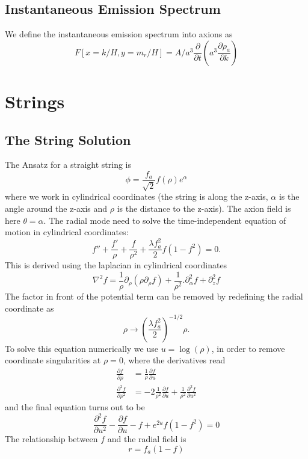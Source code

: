 \documentclass[a4paper]{article}
\begin{document}
\subsection{Instantaneous Emission Spectrum}
We define the instantaneous emission spectrum into axions as
\begin{equation}
    F[x = k / H, y = m_r / H] = A / a^3 \frac{\partial}{\partial t} \left( a^3 \frac{\partial \rho_a}{\partial k} \right)
\end{equation}

\newpage
\section{Strings}


\subsection{The String Solution}

The Ansatz for a straight string is
\begin{equation}
	\phi = \frac{f_a}{\sqrt{2}} f(\rho) e^{\alpha}
\end{equation}
where we work in cylindrical coordinates (the string is along the z-axis, $\alpha$ is the angle around the z-axis and $\rho$ is the distance to the z-axis).
The axion field is here $\theta = \alpha$.
The radial mode need to solve the time-independent equation of motion in cylindrical coordinates:
\begin{equation}
	f'' + \frac{f'}{\rho} + \frac{f}{\rho^2} + \frac{\lambda f_a^2}{2} f (1 - f^2) = 0.
\end{equation}
This is derived using the laplacian in cylindrical coordinates 
\begin{equation}
	\nabla^2 f = \frac{1}{\rho} \partial_\rho (\rho \partial_\rho f) + \frac{1}{\rho^2}. \partial_\alpha^2 f + \partial_z^2 f
\end{equation}
The factor in front of the potential term can be removed by redefining the radial coordinate 
as
\begin{equation}
	\rho \to \left( \frac{\lambda f_a^2}{2} \right)^{-1/2} \rho.
\end{equation}
To solve this equation numerically we use $u = \log(\rho)$, in order to remove coordinate singularities at $\rho = 0$, where the derivatives 
read
\begin{align}
	\frac{\partial f}{\partial \rho} &= \frac{1}{\rho} \frac{\partial f}{\partial u} \\
	\frac{\partial^2 f}{\partial \rho^2} &= - 2 \frac{1}{\rho^2} \frac{\partial f}{\partial u}  + \frac{1}{\rho^2} 	\frac{\partial^2 f}{\partial u^2} 
\end{align}
and the final equation turns out to be
\begin{equation}
	\frac{\partial^2 f}{\partial u^2} - \frac{\partial f}{\partial u} - f + e^{2u} f (1 - f^2) = 0
\end{equation}
The relationship between $f$ and the radial field is
\begin{equation}
	r = f_a (1 - f)
\end{equation}
\end{document}
